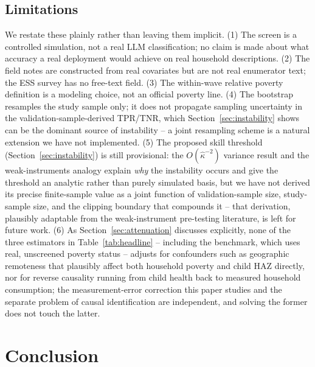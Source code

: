 \documentclass[12pt]{article}
\begin{document}
\subsection{Limitations}

We restate these plainly rather than leaving them implicit. (1) The screen is a controlled simulation, not a real LLM classification; no claim is made about what accuracy a real deployment would achieve on real household descriptions. (2) The field notes are constructed from real covariates but are not real enumerator text; the ESS survey has no free-text field. (3) The within-wave relative poverty definition is a modeling choice, not an official poverty line. (4) The bootstrap resamples the study sample only; it does not propagate sampling uncertainty in the validation-sample-derived TPR/TNR, which Section~\ref{sec:instability} shows can be the dominant source of instability -- a joint resampling scheme is a natural extension we have not implemented. (5) The proposed skill threshold (Section~\ref{sec:instability}) is still provisional: the $O(\hat\kappa^{-2})$ variance result and the weak-instruments analogy explain \emph{why} the instability occurs and give the threshold an analytic rather than purely simulated basis, but we have not derived its precise finite-sample value as a joint function of validation-sample size, study-sample size, and the clipping boundary that compounds it -- that derivation, plausibly adaptable from the weak-instrument pre-testing literature, is left for future work. (6) As Section~\ref{sec:attenuation} discusses explicitly, none of the three estimators in Table~\ref{tab:headline} -- including the benchmark, which uses real, unscreened poverty status -- adjusts for confounders such as geographic remoteness that plausibly affect both household poverty and child HAZ directly, nor for reverse causality running from child health back to measured household consumption; the measurement-error correction this paper studies and the separate problem of causal identification are independent, and solving the former does not touch the latter.

\section{Conclusion}
\label{sec:conclusion}
\end{document}
